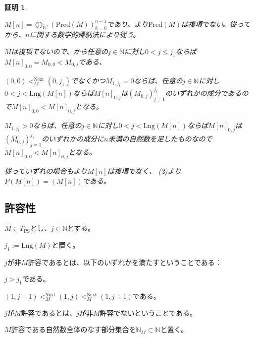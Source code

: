 \documentclass[dvipdfmx,uplatex]{jsarticle}
\theoremstyle{customnonumberbreakfortheorem}
\theoremstyle{customnonumberbreakforproof}
\newtheorem{hideableproof}{証明}
\begin{document}
\begin{hideableproof}
	\begin{penumerate}
		\item \(M[n] = \bigoplus_{\mathbb{N}^2} (\textrm{Pred}(M))_{k=0}^{n-1}\)であり、より\(\textrm{Pred}(M)\)は複項でない。従ってから、\(n\)に関する数学的帰納法により従う。
		\item \(M\)は複項でないので、から任意の\(j \in \mathbb{N}\)に対し\(0 < j \leq j_1\)ならば\(M[n]_{0,0} = M_{0,0} < M_{0,j}\)である、
		\item[] \((0,0) <_M^{\textrm{Next}} (0,j_1)\)でなくかつ\(M_{1,j_1} = 0\)ならば、任意の\(j \in \mathbb{N}\)に対し\(0 < j < \textrm{Lng}(M[n])\)ならば\(M[n]_{0,j}\)は\((M_{0,j})_{j=1}^{j_1}\)のいずれかの成分であるので\(M[n]_{0,0} < M[n]_{0,j}\)となる。
		\item[] \(M_{1,j_1} > 0\)ならば、任意の\(j \in \mathbb{N}\)に対し\(0 < j < \textrm{Lng}(M[n])\)ならば\(M[n]_{0,j}\)は\((M_{0,j})_{j=1}^{j_1}\)のいずれかの成分に\(n\)未満の自然数を足したものなので\(M[n]_{0,0} < M[n]_{0,j}\)となる。
		\item[] 従っていずれの場合もより\(M[n]\)は複項でなく、 (2)より\(P(M[n]) = (M[n])\)である。
	\end{penumerate}
\end{hideableproof}


\subsection{許容性}

\(M \in T_{\textrm{PS}}\)とし、\(j \in \mathbb{N}\)とする。
\begin{nenumerate}
	\item \(j_1 := \textrm{Lng}(M)\)と置く。
	\item \(j\)が非\(M\)許容であるとは、以下のいずれかを満たすということである：
	\begin{nenumerate}
		\item \(j > j_1\)である。
		\item \((1,j-1) <_M^{\textrm{Next}} (1,j) <_M^{\textrm{Next}} (1,j+1)\)である。
	\end{nenumerate}
	\item \(j\)が\(M\)許容であるとは、\(j\)が非\(M\)許容でないということである。
	\item \(M\)許容である自然数全体のなす部分集合を\(\mathbb{N}_M \subset \mathbb{N}\)と置く。
\end{nenumerate}
\end{document}
